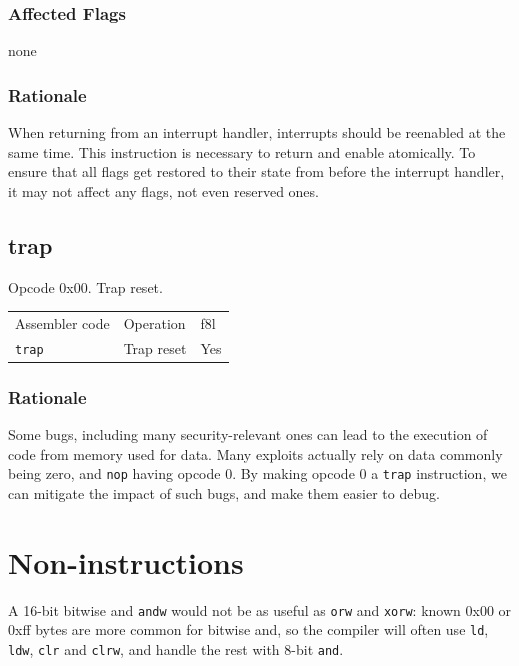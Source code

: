 \documentclass{book}
\begin{document}
\subsubsection*{Affected Flags}

none

\subsubsection*{Rationale}

When returning from an interrupt handler, interrupts should be reenabled at the same time. This instruction is necessary to return and enable atomically. To ensure that all flags get restored to their state from before the interrupt handler, it may not affect any flags, not even reserved ones.


\subsection{trap}\label{inst:trap}

Opcode 0x00. Trap reset.

\begin{tabular}{l l l}
Assembler code  & Operation  & f8l \\
\texttt{trap}   & Trap reset & Yes \\
\end{tabular}

\subsubsection*{Rationale}

Some bugs, including many security-relevant ones can lead to the execution of code from memory used for data. Many exploits actually rely on data commonly being zero, and \texttt{nop} having opcode 0. By making opcode 0 a \texttt{trap} instruction, we can mitigate the impact of such bugs, and make them easier to debug.


\section{Non-instructions}

A 16-bit bitwise and \texttt{andw} would not be as useful as \texttt{orw} and \texttt{xorw}: known 0x00 or 0xff bytes are more common for bitwise and, so the compiler will often use \texttt{ld}, \texttt{ldw}, \texttt{clr} and \texttt{clrw}, and handle the rest with 8-bit \texttt{and}.
\end{document}
